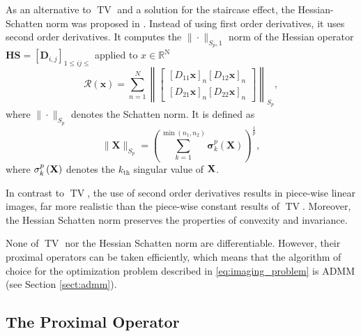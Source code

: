As an alternative to $\operatorname{TV}$ and a solution for the staircase effect, the Hessian-Schatten norm was proposed in \cite{lefkimmiatis_hessian_2013}. Instead of using first order derivatives, it uses second order derivatives. It computes the $\|\cdot \|_{S_p, 1}$ norm of the Hessian operator $\mathbf{HS} = [\mathbf{D}_{i, j}]_{1\leq ij\leq}$ applied to $x\in \mathbb{R}^\mathrm{N}$
\begin{equation}
    \mathcal{R}(\mathbf{x}) = \sum^N_{n = 1}\left\|
  \begin{bmatrix}
    [D_{11}\mathbf{x}]_n [D_{12}\mathbf{x}]_n\\
    [D_{21}\mathbf{x}]_n [D_{22}\mathbf{x}]_n
  \end{bmatrix}\right\|_{S_p}, 
    \label{eq:hs}
\end{equation}
where $\|\cdot \|_{S_p}$ denotes the Schatten norm. It is defined as
\begin{equation}
    \|\mathbf{X}\|_{S_p} = \left( \sum_{k=1}^{\min\left(n_{1},n_{2}\right)}\mathbf{\sigma}_{k}^{p}\left({\mathbf X}\right)\right)^\frac{1}{p}, 
    \label{eq:schatten_norm}
\end{equation}
where $\mathbf{\sigma}_{k}^{p}\left({\bf X}\right)$ denotes the $k_{\mathrm{th}}$ singular value of $\bf{X}$. 

In contrast to $\operatorname{TV}$, the use of second order derivatives results in piece-wise linear images, far more realistic than the piece-wise constant results of $\operatorname{TV}$. Moreover, the Hessian Schatten norm preserves the properties of convexity and invariance.

None of $\operatorname{TV}$ nor the Hessian Schatten norm are differentiable. However, their proximal operators can be taken efficiently, which means that the algorithm of choice for the optimization problem described in  \eqref{eq:imaging_problem} is ADMM (see Section \ref{sect:admm}). 

\subsection{The Proximal Operator} \label{sect:2prox}

